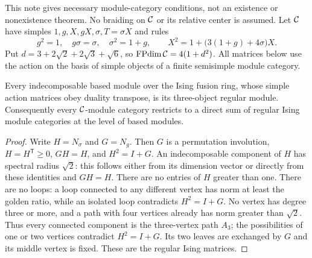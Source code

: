 
This note gives necessary module-category conditions, not an existence or
nonexistence theorem. No braiding on $\mathcal C$ or its relative center is assumed.
Let $\mathcal C$ have simples $1,g,X,gX,\sigma,T=\sigma X$ and rules
\[
g^2=1,\quad g\sigma=\sigma,\quad\sigma^2=1+g,\qquad
X^2=1+\bigl(3(1+g)+4\sigma\bigr)X.
\]
Put $d=3+2\sqrt2+2\sqrt3+\sqrt6$, so $\operatorname{FPdim}\mathcal C=4(1+d^2)$.
All matrices below use the action on the basis of simple objects of a
finite semisimple module category.

\begin{lemma}
Every indecomposable based module over the Ising fusion ring, whose
simple action matrices obey duality transpose, is its three-object regular
module. Consequently every $\mathcal C$-module category restricts to a direct sum
of regular Ising module categories at the level of based modules.
\end{lemma}
\begin{proof}
Write $H=N_\sigma$ and $G=N_g$. Then $G$ is a permutation involution,
$H=H^{\mathsf T}\geq0$, $GH=H$, and $H^2=I+G$. An indecomposable
component of $H$ has spectral radius $\sqrt2$: this follows either from
its dimension vector or directly from these identities and $GH=H$.
There are no entries of $H$ greater than one. There are no loops: a loop
connected to any different vertex has norm at least the golden ratio,
while an isolated loop contradicts $H^2=I+G$. No vertex has degree three
or more, and a path with four vertices already has norm greater than
$\sqrt2$. Thus every connected component is the three-vertex path
$A_3$; the possibilities of one or two vertices contradict $H^2=I+G$.
Its two leaves are exchanged by $G$ and its middle vertex is fixed.
These are the regular Ising matrices.
\end{proof}

